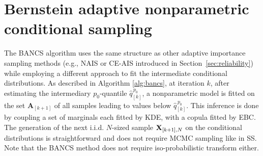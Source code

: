 \section{Bernstein adaptive nonparametric conditional sampling}\label{sec:bancs}


The BANCS algorithm uses the same structure as other adaptive importance sampling methods (e.g., NAIS or CE-AIS introduced in Section~\ref{sec:reliability}) while employing a different approach to fit the intermediate conditional distributions. 
As described in Algorithm \ref{alg:bancs}, at iteration $k$, after estimating the intermediary $p_0$-quantile $\widehat{q}_{[k]}^{\, p_0}$, a nonparametric model is fitted on the set $\mathbf{A}_{[k+1]}$ of all samples leading to values below $\widehat{q}_{[k]}^{\, p_0}$.  
This inference is done by coupling a set of marginals each fitted by KDE, with a copula fitted by EBC. 
The generation of the next i.i.d. $N$-sized sample ${\bf X}_{[k+1], N}$ on the conditional distributions is straightforward and does not require MCMC sampling like in SS. 
Note that the BANCS method does not require iso-probabilistic transform either.

